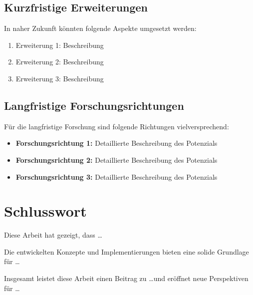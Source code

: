 \subsection{Kurzfristige Erweiterungen}
In naher Zukunft könnten folgende Aspekte umgesetzt werden:
\begin{enumerate}
    \item Erweiterung 1: Beschreibung
    \item Erweiterung 2: Beschreibung
    \item Erweiterung 3: Beschreibung
\end{enumerate}

\subsection{Langfristige Forschungsrichtungen}
Für die langfristige Forschung sind folgende Richtungen vielversprechend:
\begin{itemize}
    \item \textbf{Forschungsrichtung 1:} Detaillierte Beschreibung des Potenzials
    \item \textbf{Forschungsrichtung 2:} Detaillierte Beschreibung des Potenzials
    \item \textbf{Forschungsrichtung 3:} Detaillierte Beschreibung des Potenzials
\end{itemize}

\section{Schlusswort}
\label{sec:schlusswort}

Diese Arbeit hat gezeigt, dass \dots

Die entwickelten Konzepte und Implementierungen bieten eine solide Grundlage für \dots

Insgesamt leistet diese Arbeit einen Beitrag zu \dots und eröffnet neue Perspektiven für \dots

